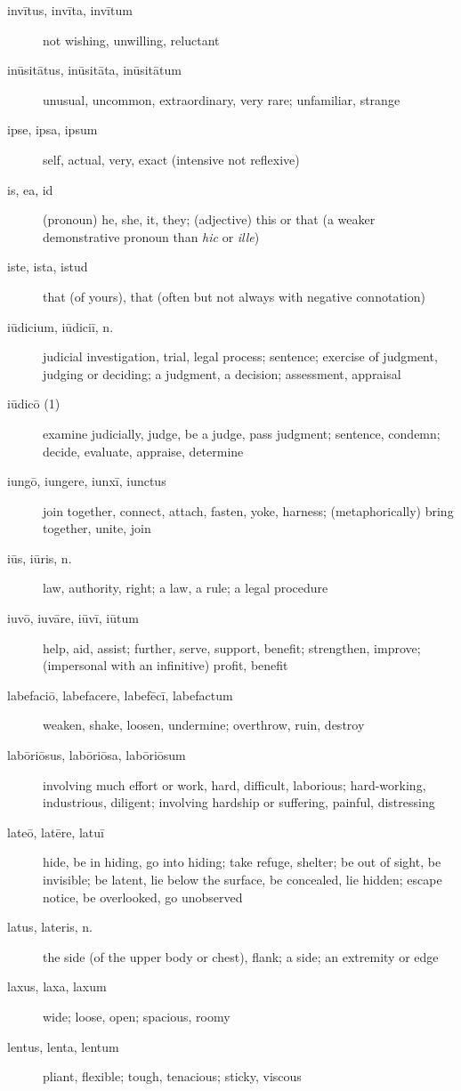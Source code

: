 \begin{description}
    \item[invītus, invīta, invītum] not wishing, unwilling, reluctant
    \item[inūsitātus, inūsitāta, inūsitātum] unusual, uncommon, extraordinary, very rare; unfamiliar, strange
    \item[ipse, ipsa, ipsum] self, actual, very, exact (intensive not reflexive)
    \item[is, ea, id] (pronoun) he, she, it, they; (adjective) this or that (a weaker demonstrative pronoun than \textit{hic} or \textit{ille})
    \item[iste, ista, istud] that (of yours), that (often but not always with negative connotation)
    \item[iūdicium, iūdiciī, n.] judicial investigation, trial, legal process; sentence; exercise of judgment, judging or deciding; a judgment, a decision; assessment, appraisal
    \item[iūdicō (1)] examine judicially, judge, be a judge, pass judgment; sentence, condemn; decide, evaluate, appraise, determine
    \item[iungō, iungere, iunxī, iunctus] join together, connect, attach, fasten, yoke, harness; (metaphorically) bring together, unite, join
    \item[iūs, iūris, n.] law, authority, right; a law, a rule; a legal procedure
    \item[iuvō, iuvāre, iūvī, iūtum] help, aid, assist; further, serve, support, benefit; strengthen, improve; (impersonal with an infinitive) profit, benefit
    \item[labefaciō, labefacere, labefēcī, labefactum] weaken, shake, loosen, undermine; overthrow, ruin, destroy
    \item[labōriōsus, labōriōsa, labōriōsum] involving much effort or work, hard, difficult, laborious; hard-working, industrious, diligent; involving hardship or suffering, painful, distressing
    \item[lateō, latēre, latuī] hide, be in hiding, go into hiding; take refuge, shelter; be out of sight, be invisible; be latent, lie below the surface, be concealed, lie hidden; escape notice, be overlooked, go unobserved
    \item[latus, lateris, n.] the side (of the upper body or chest), flank; a side; an extremity or edge
    \item[laxus, laxa, laxum] wide; loose, open; spacious, roomy
    \item[lentus, lenta, lentum] pliant, flexible; tough, tenacious; sticky, viscous

\end{description}
